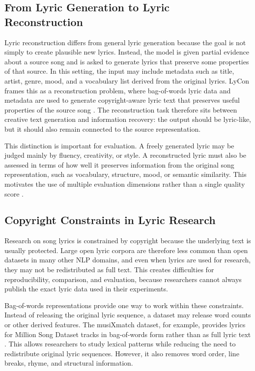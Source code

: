 \subsection{From Lyric Generation to Lyric Reconstruction}

Lyric reconstruction differs from general lyric generation because the goal is not simply to create plausible new lyrics. Instead, the model is given partial evidence about a source song and is asked to generate lyrics that preserve some properties of that source. In this setting, the input may include metadata such as title, artist, genre, mood, and a vocabulary list derived from the original lyrics. LyCon frames this as a reconstruction problem, where bag-of-words lyric data and metadata are used to generate copyright-aware lyric text that preserves useful properties of the source song \cite{kim2024lycon}. The reconstruction task therefore sits between creative text generation and information recovery: the output should be lyric-like, but it should also remain connected to the source representation.

This distinction is important for evaluation. A freely generated lyric may be judged mainly by fluency, creativity, or style. A reconstructed lyric must also be assessed in terms of how well it preserves information from the original song representation, such as vocabulary, structure, mood, or semantic similarity. This motivates the use of multiple evaluation dimensions rather than a single quality score \cite{kim2024lycon}.

\subsection{Copyright Constraints in Lyric Research}

Research on song lyrics is constrained by copyright because the underlying text is usually protected. Large open lyric corpora are therefore less common than open datasets in many other NLP domains, and even when lyrics are used for research, they may not be redistributed as full text. This creates difficulties for reproducibility, comparison, and evaluation, because researchers cannot always publish the exact lyric data used in their experiments.

Bag-of-words representations provide one way to work within these constraints. Instead of releasing the original lyric sequence, a dataset may release word counts or other derived features. The musiXmatch dataset, for example, provides lyrics for Million Song Dataset tracks in bag-of-words form rather than as full lyric text \cite{bertinmahieux2011million,musixmatch2011dataset}. This allows researchers to study lexical patterns while reducing the need to redistribute original lyric sequences. However, it also removes word order, line breaks, rhyme, and structural information.

